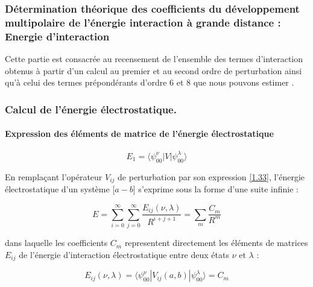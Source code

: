 \subsubsection{Détermination théorique des coefficients du développement multipolaire de l’énergie interaction à grande distance : Energie d’interaction}


Cette partie est consacrée au recensement de l'ensemble des termes d'interaction obtenus à partir d'un calcul au premier et au second ordre de perturbation ainsi qu'à celui des termes prépondérants d'ordre 6 et 8 que nous pouvons estimer \cite{saute1982calculated}.

\subsubsection{Calcul de l’énergie électrostatique.}

\paragraph{Expression des éléments de matrice de l'énergie électrostatique}

\begin{equation}
E_{1} = \langle \psi_{00}^{\nu}|V| \psi_{00}^{\lambda}\rangle
\end{equation}
	
	
En remplaçant l'opérateur $V_{ij}$ de perturbation par son expression \ref{1.33}, l'énergie électrostatique d'un système [$a-b$] s'exprime sous la forme d'une suite infinie : 
	
\begin{equation}
E = \sum_{i=0}^{\infty} \sum_{j=0}^{\infty} \frac{E_{ij} (\nu,\lambda)}{R^{i+j+1}} = \sum_{m} \frac{C_{m}}{R^{m}}
\end{equation}
	
dans laquelle les coefficients $C_{m}$ representent directement les éléments de matrices $E_{ij}$ de l'énergie d'interaction électrostatique entre deux états $\nu$ et $\lambda$ : 
	
\begin{equation}
E_{ij}(\nu, \lambda) = \langle \psi_{00}^{\nu}|V_{ij}(a,b)|\psi_{00}^{\lambda} \rangle = C_{m}
\end{equation}
	
